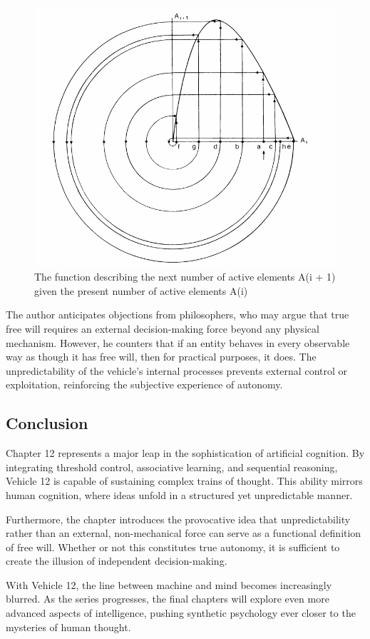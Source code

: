 \documentclass{article}
\begin{document}
	\begin{figure}[h]
		\centering
		\includegraphics[scale=0.5]{images/figure-19.png}
		\caption{The function describing the next number of active elements A(i + 1) given the 
		present number of active elements A(i)}
		\label{fig:vehicle-19}
	\end{figure}

	The author anticipates objections from philosophers, who may argue that true free will requires an external decision-making force beyond any physical mechanism. However, he counters that if an entity behaves in every observable way as though it has free will, then for practical purposes, it does. The unpredictability of the vehicle's internal processes prevents external control or exploitation, reinforcing the subjective experience of autonomy.  


	\subsection*{Conclusion}
	
	Chapter 12 represents a major leap in the sophistication of artificial cognition. By integrating threshold control, associative learning, and sequential reasoning, Vehicle 12 is capable of sustaining complex trains of thought. This ability mirrors human cognition, where ideas unfold in a structured yet unpredictable manner.  

	Furthermore, the chapter introduces the provocative idea that unpredictability rather than an external, non-mechanical force can serve as a functional definition of free will. Whether or not this constitutes true autonomy, it is sufficient to create the illusion of independent decision-making.  

	With Vehicle 12, the line between machine and mind becomes increasingly blurred. As the series progresses, the final chapters will explore even more advanced aspects of intelligence, pushing synthetic psychology ever closer to the mysteries of human thought.  
\end{document}
